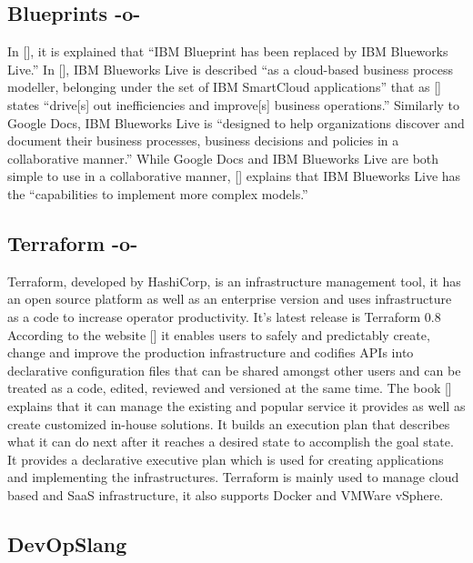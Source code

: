\subsection{Blueprints -o-}

In [\cite{www-blueprints}], it is explained that ``IBM Blueprint has
been replaced by IBM Blueworks Live.'' In [\cite{www-blueworks-live2}],
IBM Blueworks Live is described ``as a cloud-based business process
modeller, belonging under the set of IBM SmartCloud applications''
that as [\cite{www-blueworks-live}] states ``drive[s] out
inefficiencies and improve[s] business operations.'' Similarly to
Google Docs, IBM Blueworks Live is ``designed to help organizations
discover and document their business processes, business decisions and
policies in a collaborative manner.'' While Google Docs and IBM
Blueworks Live are both simple to use in a collaborative manner,
 [\cite{www-blueworks-live2}] explains that IBM Blueworks Live has the
``capabilities to implement more complex models.''

\subsection{Terraform -o-}

Terraform, developed by HashiCorp, is an infrastructure management
tool, it has an open source platform as well as an enterprise version
and uses infrastructure as a code to increase operator
productivity. It's latest release is Terraform 0.8 According to the
website [\cite{www-Terraform}] it enables users to safely and
predictably create, change and improve the production infrastructure
and codifies APIs into declarative configuration files that can be
shared amongst other users and can be treated as a code, edited,
reviewed and versioned at the same time. The
book [\cite{www-terraform-book}] explains that it can manage the
existing and popular service it provides as well as create customized
in-house solutions. It builds an execution plan that describes what it
can do next after it reaches a desired state to accomplish the goal
state. It provides a declarative executive plan which is used for
creating applications and implementing the infrastructures. Terraform
is mainly used to manage cloud based and SaaS infrastructure, it also
supports Docker and VMWare vSphere.
     
\subsection{DevOpSlang}
     

